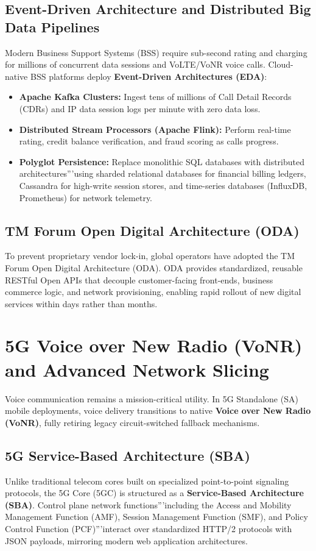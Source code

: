 \documentclass[12pt,a4paper]{report}
\begin{document}
\subsection{Event-Driven Architecture and Distributed Big Data Pipelines}
Modern Business Support Systems (BSS) require sub-second rating and charging for millions of concurrent data sessions and VoLTE/VoNR voice calls. Cloud-native BSS platforms deploy \textbf{Event-Driven Architectures (EDA)}:
\begin{itemize}
    \item \textbf{Apache Kafka Clusters:} Ingest tens of millions of Call Detail Records (CDRs) and IP data session logs per minute with zero data loss.
    \item \textbf{Distributed Stream Processors (Apache Flink):} Perform real-time rating, credit balance verification, and fraud scoring as calls progress.
    \item \textbf{Polyglot Persistence:} Replace monolithic SQL databases with distributed architectures'''using sharded relational databases for financial billing ledgers, Cassandra for high-write session stores, and time-series databases (InfluxDB, Prometheus) for network telemetry.
\end{itemize}

\subsection{TM Forum Open Digital Architecture (ODA)}
To prevent proprietary vendor lock-in, global operators have adopted the TM Forum Open Digital Architecture (ODA). ODA provides standardized, reusable RESTful Open APIs that decouple customer-facing front-ends, business commerce logic, and network provisioning, enabling rapid rollout of new digital services within days rather than months.

\section{5G Voice over New Radio (VoNR) and Advanced Network Slicing}
Voice communication remains a mission-critical utility. In 5G Standalone (SA) mobile deployments, voice delivery transitions to native \textbf{Voice over New Radio (VoNR)}, fully retiring legacy circuit-switched fallback mechanisms.

\subsection{5G Service-Based Architecture (SBA)}
Unlike traditional telecom cores built on specialized point-to-point signaling protocols, the 5G Core (5GC) is structured as a \textbf{Service-Based Architecture (SBA)}. Control plane network functions'''including the Access and Mobility Management Function (AMF), Session Management Function (SMF), and Policy Control Function (PCF)'''interact over standardized HTTP/2 protocols with JSON payloads, mirroring modern web application architectures.
\end{document}
